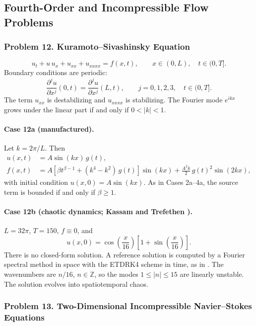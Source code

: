 \documentclass[11pt]{article}
\begin{document}
\subsection{Fourth-Order and Incompressible Flow Problems}

\subsubsection*{Problem 12. Kuramoto--Sivashinsky Equation}

\[
\boxed{u_t+u\,u_x+u_{xx}+u_{xxxx}=f(x,t)},
\qquad x\in(0,L),
\quad t\in(0,T].
\]
Boundary conditions are periodic:
\[
\frac{\partial^j u}{\partial x^j}(0,t)=\frac{\partial^j u}{\partial x^j}(L,t),
\qquad j=0,1,2,3,
\quad t\in(0,T].
\]
The term $u_{xx}$ is destabilizing and $u_{xxxx}$ is stabilizing. The
Fourier mode $e^{ikx}$ grows under the linear part if and only if
$0<|k|<1$.

\paragraph{Case 12a (manufactured).}
Let $k=2\pi/L$. Then
\[
\begin{aligned}
u(x,t)&=A\sin(kx)\,g(t),\\
f(x,t)&=A\left[\beta t^{\beta-1}+(k^4-k^2)\,g(t)\right]\sin(kx)
+\frac{A^2k}{2}\,g(t)^2\sin(2kx),
\end{aligned}
\]
with initial condition $u(x,0)=A\sin(kx)$. As in Cases 2a--4a, the
source term is bounded if and only if $\beta\ge1$.

\paragraph{Case 12b (chaotic dynamics; Kassam and Trefethen \cite{KT05}).}
$L=32\pi$, $T=150$, $f\equiv0$, and
\[
u(x,0)=\cos\!\left(\frac{x}{16}\right)\left[1+\sin\!\left(\frac{x}{16}\right)\right].
\]
There is no closed-form solution. A reference solution is computed by a
Fourier spectral method in space with the ETDRK4 scheme in time, as in
\cite{KT05}. The wavenumbers are $n/16$, $n\in\mathbb{Z}$, so the
modes $1\le|n|\le15$ are linearly unstable. The solution evolves into
spatiotemporal chaos.

\subsubsection*{Problem 13. Two-Dimensional Incompressible Navier--Stokes Equations}
\end{document}
